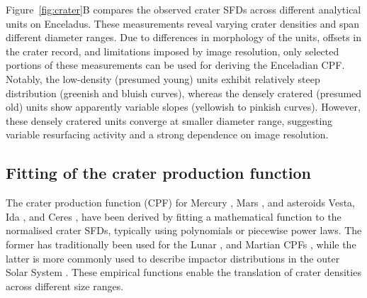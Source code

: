 \documentclass[preprint,11pt,3p,times,authoryear]{elsarticle}
\begin{document}
Figure~\ref{fig:crater}B compares the observed crater SFDs across different analytical units on Enceladus. These measurements reveal varying crater densities and span different diameter ranges. Due to differences in morphology of the units, offsets in the crater record, and limitations imposed by image resolution, only selected portions of these measurements can be used for deriving the Enceladian CPF. Notably, the low-density (presumed young) units exhibit relatively steep distribution (greenish and bluish curves), whereas the densely cratered (presumed old) units show apparently variable slopes (yellowish to pinkish curves). However, these densely cratered units converge at smaller diameter range, suggesting variable resurfacing activity and a strong dependence on image resolution.%

\subsection{Fitting of the crater production function}
\label{subsec:fitting}
The crater production function (CPF) for Mercury \citep{Neukum2001}, Mars \citep{Ivanov2001, Hartmann2005}, and asteroids Vesta, Ida \citep{Schmedemann2014}, and Ceres \citep{Hiesinger2016}, have been derived by fitting a mathematical function to the normalised crater SFDs, typically using polynomials or piecewise power laws. The former has traditionally been used for the Lunar \citep{Neukum2001}, and Martian CPFs \citep{Ivanov2001}, while the latter is more commonly used to describe impactor distributions in the outer Solar System \citep{Zahnle2003}. These empirical functions enable the translation of crater densities across different size ranges. \\
\end{document}

